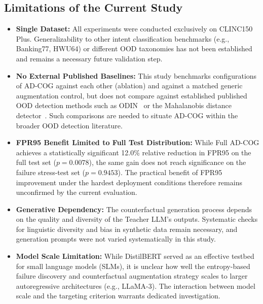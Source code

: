 \documentclass[11pt,a4paper]{article}
\begin{document}
\subsection{Limitations of the Current Study}
\begin{itemize}
    \item \textbf{Single Dataset:} All experiments were conducted exclusively on CLINC150 Plus. Generalizability to other intent classification benchmarks (e.g., Banking77, HWU64) or different OOD taxonomies has not been established and remains a necessary future validation step.

    \item \textbf{No External Published Baselines:} This study benchmarks configurations of AD-COG against each other (ablation) and against a matched generic augmentation control, but does not compare against established published OOD detection methods such as ODIN~\cite{liang2018enhancing} or the Mahalanobis distance detector~\cite{lee2018simple}. Such comparisons are needed to situate AD-COG within the broader OOD detection literature.

    \item \textbf{FPR95 Benefit Limited to Full Test Distribution:} While Full AD-COG achieves a statistically significant 12.0\% relative reduction in FPR95 on the full test set ($p = 0.0078$), the same gain does not reach significance on the failure stress-test set ($p = 0.9453$). The practical benefit of FPR95 improvement under the hardest deployment conditions therefore remains unconfirmed by the current evaluation.

    \item \textbf{Generative Dependency:} The counterfactual generation process depends on the quality and diversity of the Teacher LLM's outputs. Systematic checks for linguistic diversity and bias in synthetic data remain necessary, and generation prompts were not varied systematically in this study.

    \item \textbf{Model Scale Limitation:} While DistilBERT served as an effective testbed for small language models (SLMs), it is unclear how well the entropy-based failure discovery and counterfactual augmentation strategy scales to larger autoregressive architectures (e.g., LLaMA-3). The interaction between model scale and the targeting criterion warrants dedicated investigation.
\end{itemize}
\end{document}
